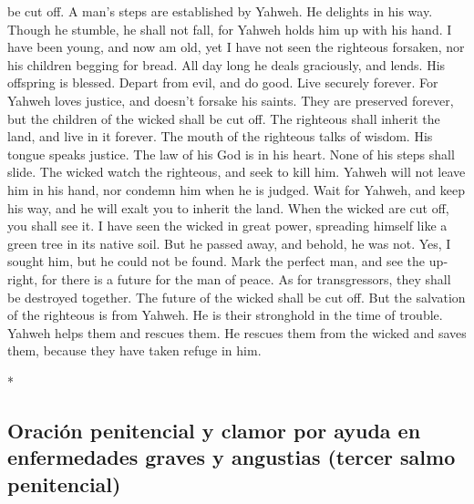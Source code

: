 \begin{paracol}{2}
\begin{otherlanguage}{english}
be cut off.  A man's steps are established by Yahweh. He
delights in his way.  Though he stumble, he shall not
fall, for Yahweh holds him up with his hand.  I have been
young, and now am old, yet I have not seen the righteous forsaken, nor
his children begging for bread.  All day long he deals
graciously, and lends. His offspring is blessed.  Depart
from evil, and do good. Live securely forever.  For
Yahweh loves justice, and doesn't forsake his saints. They are preserved
forever, but the children of the wicked shall be cut off.
 The righteous shall inherit the land, and live in it
forever.  The mouth of the righteous talks of wisdom. His
tongue speaks justice.  The law of his God is in his
heart. None of his steps shall slide.  The wicked watch
the righteous, and seek to kill him.  Yahweh will not
leave him in his hand, nor condemn him when he is judged.
 Wait for Yahweh, and keep his way, and he will exalt you
to inherit the land. When the wicked are cut off, you shall see it.
 I have seen the wicked in great power, spreading himself
like a green tree in its native soil.  But he passed
away, and behold, he was not. Yes, I sought him, but he could not be
found.  Mark the perfect man, and see the upright, for
there is a future for the man of peace.  As for
transgressors, they shall be destroyed together. The future of the
wicked shall be cut off.  But the salvation of the
righteous is from Yahweh. He is their stronghold in the time of trouble.
 Yahweh helps them and rescues them. He rescues them from
the wicked and saves them, because they have taken refuge in him.

\end{otherlanguage}

\switchcolumn[0]*

\hypertarget{oraciuxf3n-penitencial-y-clamor-por-ayuda-en-enfermedades-graves-y-angustias-tercer-salmo-penitencial}{%
\subsection{Oración penitencial y clamor por ayuda en enfermedades
graves y angustias (tercer salmo
penitencial)}\label{oraciuxf3n-penitencial-y-clamor-por-ayuda-en-enfermedades-graves-y-angustias-tercer-salmo-penitencial}}


\end{paracol}
